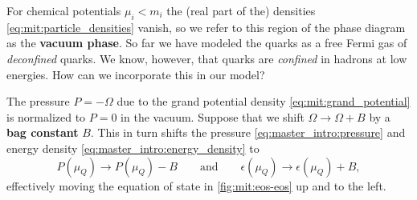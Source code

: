 For chemical potentials $\mu_i < m_i$ the (real part of the) densities \eqref{eq:mit:particle_densities} vanish,
so we refer to this region of the phase diagram as the \textbf{vacuum phase}.
So far we have modeled the quarks as a free Fermi gas of \emph{deconfined} quarks.
We know, however, that quarks are \emph{confined} in hadrons at low energies.
How can we incorporate this in our model?

The pressure $P = -\Omega$ due to the grand potential density \eqref{eq:mit:grand_potential} is normalized to $P = 0$ in the vacuum.
Suppose that we shift $\Omega \rightarrow \Omega + B$ by a \textbf{bag constant} $B$.
This in turn shifts the pressure \eqref{eq:master_intro:pressure} and energy density \eqref{eq:master_intro:energy_density} to
\begin{equation}
	P(\mu_Q) \rightarrow P(\mu_Q) - B
	\qquad \text{and} \qquad
	\epsilon(\mu_Q) \rightarrow \epsilon(\mu_Q) + B,
\label{eq:mit:bag_shift}
\end{equation}
effectively moving the equation of state in \cref{fig:mit:eos-eos} up and to the left.

